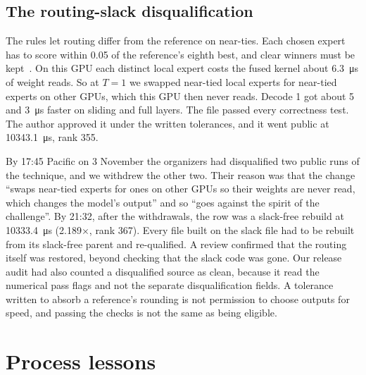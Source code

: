 \documentclass[11pt]{article}
\begin{document}
\subsection{The routing-slack disqualification}

The rules let routing differ from the reference on near-ties. Each chosen expert
has to score within 0.05 of the reference's eighth best, and clear winners must
be kept~\cite{task}. On this GPU each distinct local expert costs the fused kernel
about \SI{6.3}{\micro\second} of weight reads. So at $T=1$ we swapped near-tied
local experts for near-tied experts on other GPUs, which this GPU then never
reads. Decode 1 got about 5 and \SI{3}{\micro\second} faster on sliding and full
layers. The file passed every correctness test. The author approved it under the
written tolerances, and it went public at \SI{10343.1}{\micro\second}, rank 355.

By 17:45 Pacific on 3 November the organizers had disqualified two public runs of
the technique, and we withdrew the other two. Their reason was that the change
``swaps near-tied experts for ones on other GPUs so their weights are never read,
which changes the model's output'' and so ``goes against the spirit of the
challenge''. By 21:32, after the withdrawals, the row was a slack-free rebuild
at \SI{10333.4}{\micro\second} (2.189$\times$, rank 367). Every file built on the slack file had to be rebuilt from its
slack-free parent and re-qualified. A review confirmed that the routing itself was
restored, beyond checking that the slack code was gone. Our release audit had also
counted a disqualified source as clean, because it read the numerical pass flags
and not the separate disqualification fields. A tolerance written to absorb a
reference's rounding is not permission to choose outputs for speed, and passing
the checks is not the same as being eligible.

\section{Process lessons}
\label{sec:lessons}
\end{document}
